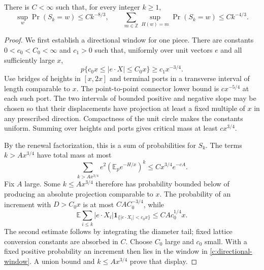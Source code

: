 \begin{proposition}\label{c:planar-atoms}
There is $C<\infty$ such that, for every integer $k\ge1$,
\begin{equation}\label{c:two-atom-bounds}
 \sup_w\Pr(S_k=w)\le Ck^{-8/3},\qquad
 \sum_{m\in\mathbb Z}\sup_{H(w)=m}\Pr(S_k=w)
 \le Ck^{-4/3}.
\end{equation}
\end{proposition}

\begin{proof}
We first establish a directional window for one piece.  There are constants
$0<c_0<C_0<\infty$ and $c_1>0$ such that, uniformly over unit vectors $e$
and all sufficiently large $x$,
\begin{equation}\label{c:directional-window}
 p\{c_0x\le |e\cdot X|\le C_0x\}\ge c_1x^{-3/4}.
\end{equation}
Use bridges of heights in $[x,2x]$ and terminal ports in a transverse
interval of length comparable to $x$.  The point-to-point connector lower
bound is $cx^{-5/4}$ at each such port.  The two intervals of bounded
positive and negative slope may be chosen so that their displacements
have projection at least a fixed multiple of $x$ in any prescribed
direction.  Compactness of the unit circle makes the constants uniform.
Summing over heights and ports gives critical mass at least $cx^{3/4}$.

By the renewal factorization, this is a sum of probabilities for $S_k$.
The terms $k>Ax^{3/4}$ have total mass at most
\[
 \sum_{k>Ax^{3/4}}e^2
   (\mathbb E_p e^{-H/x})^k
 \le Cx^{3/4}e^{-cA}.
\]
Fix $A$ large.  Some $k\le Ax^{3/4}$ therefore has probability bounded
below of producing an absolute projection comparable to $x$.
The probability of an increment with $D>C_0x$ is at most
$CA C_0^{-3/4}$, while
\[
 \mathbb E\sum_{i\le k}|e\cdot X_i|
       \mathbf1_{\{|e\cdot X_i|<c_0x\}}
 \le CA c_0^{1/4}x.
\]
The second estimate follows by integrating the diameter tail; fixed
lattice conversion constants are absorbed in $C$.  Choose $C_0$ large
and $c_0$ small.  With a fixed positive probability an increment then
lies in the window in \eqref{c:directional-window}.  A union bound and
$k\le Ax^{3/4}$ prove that display.


\end{proof}
